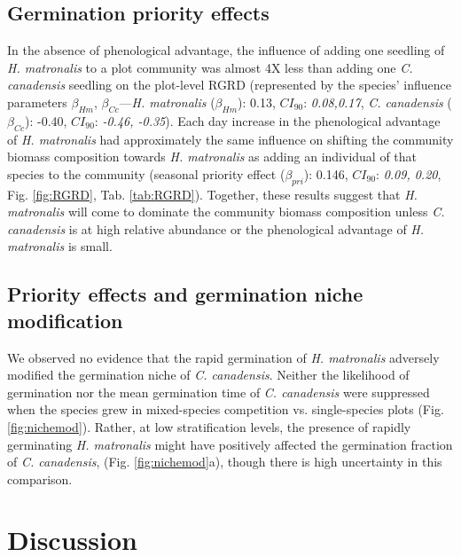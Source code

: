 \documentclass{article}[11pt]
\begin{document}
{\subsection*{Germination priority effects}
In the absence of phenological advantage, the influence  of adding one seedling of \textit{H. matronalis} to a plot community was almost 4X less than adding one \textit{C. canadensis} seedling on the plot-level RGRD (represented by the species' influence parameters $\beta_{Hm}$, $\beta_{Cc}$---\textit{H. matronalis} ($\beta_{Hm}$): 0.13, $CI_{90}$: \textit{0.08,0.17}, \textit{C. canadensis} ($\beta_{Cc}$): -0.40, $CI_{90}$: \textit{-0.46, -0.35}). Each day increase in the phenological advantage of \textit{ H. matronalis} had approximately the same influence on shifting the community biomass composition towards \textit{H. matronalis} as adding an individual of that species to the community (seasonal priority effect ($\beta_{pri}$): 0.146, $CI_{90}$: \textit{0.09, 0.20}, Fig. \ref{fig:RGRD}, Tab. \ref{tab:RGRD}). Together, these results suggest that \textit{H. matronalis} will come to dominate the community biomass composition unless \textit{C. canadensis} is at high relative abundance or the phenological advantage of \textit{H. matronalis} is small. %

\subsection*{Priority effects and germination niche modification}
We observed no evidence that the rapid germination of \textit{H. matronalis} adversely modified the germination niche of \textit{C. canadensis}. Neither the likelihood of germination nor the mean germination time of \textit{C. canadensis} were suppressed when the species grew in mixed-species competition vs. single-species plots (Fig. \ref{fig:nichemod}). Rather, at low stratification levels, the presence of rapidly germinating \textit{H. matronalis} might have positively affected the germination fraction of \textit{C. canadensis}, (Fig. \ref{fig:nichemod}a), though there is high uncertainty in this comparison.

\section*{Discussion}
}
\end{document}
